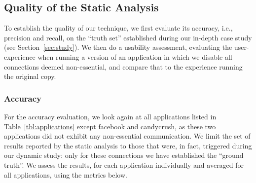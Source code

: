 
\subsection{Quality of the Static Analysis}
To establish the quality of our technique, we 
first evaluate its accuracy, i.e., precision and recall, on the ``truth set'' established during our in-depth case study (see Section~\ref{sec:study}).
We then do a usability assessment, evaluating the user-experience when running a version of an application in which we disable all connections deemed non-essential, and compare that to the experience running the original copy.  

\subsubsection{Accuracy}
For the accuracy evaluation, we look again at all applications listed in 
Table~\ref{tbl:applications} except facebook and candycrush, as these two applications  did not exhibit any non-essential communication. We limit the set of results reported by the static analysis to those that were, in fact, triggered during our dynamic study: only for these connections we have established the ``ground truth''. 
We assess the results, for each application individually and averaged for all applications, using the metrics below. 

